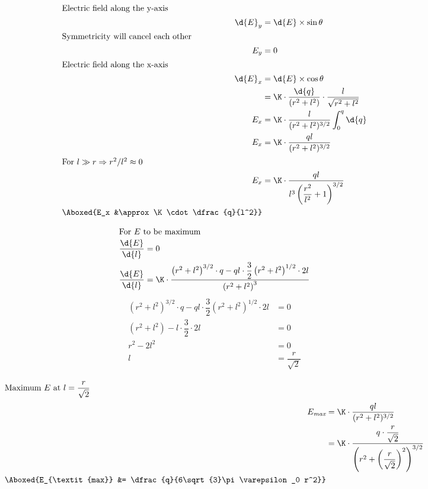 \documentclass{article}
\begin{document}
\addtolength{\jot}{3ex}
\begin{align*}
\intertext{Electric field along the y-axis}
\d{E}_y &= \d{E}\times\sin\theta\\
\intertext{Symmetricity will cancel each other}
E_y &= 0\\
\intertext{Electric field along the x-axis}
\d{E}_x &= \d{E}\times\cos\theta\\
		&= \K\cdot \dfrac{\d{q}}{(r^2+l^2)} \cdot \dfrac{l}{\sqrt{r^2+ l^2}}\\
E_x	&=  \K \cdot \dfrac{l}{(r^2+l^2)^{3/2}} \int_0^q \d{q}\\
E_x	&=  \K \cdot \dfrac{ql}{(r^2+l^2)^{3/2}} \\
\intertext{For $l\gg r \Rightarrow r^2/l^2 \approx 0$}
E_x	&= \K \cdot \dfrac{ql}{l^3\left(\dfrac{r^2}{l^2}+1\right)^{3/2}}\\
\Aboxed{E_x &\approx\K \cdot \dfrac{q}{l^2}}
\end{align*}

\pagebreak

\begin{align*}
\intertext{For $E$ to be maximum}
\dfrac{\d{E}}{\d{l}} &= 0\\
\dfrac{\d{E}}{\d{l}} &= \K \cdot \dfrac{\left(r^2+l^2\right)^{3/2}\cdot q-ql\cdot\dfrac{3}{2}\left(r^2+l^2\right)^{1/2}\cdot 2l}{\left(r^2+l^2\right)^3}
\end{align*}
\begin{align*}
\left(r^2+l^2\right)^{3/2}\cdot q-ql\cdot\dfrac{3}{2}\left(r^2+l^2\right)^{1/2}\cdot 2l &= 0\\
\left(r^2+l^2\right)-l\cdot\dfrac{3}{2}\cdot 2l &= 0\\
r^2 - 2l^2 &= 0\\
l &= \dfrac{r}{\sqrt{2}}
\end{align*}

\pagebreak

\begin{align*}
\intertext{Maximum $E$ at $l = \dfrac{r}{\sqrt{2}}$}
E_{\textit{max}} &= \K \cdot \dfrac{ql}{(r^2+l^2)^{3/2}} \\
	&= \K \cdot \dfrac{q\cdot \dfrac{r}{\sqrt{2}}}{\left(r^2+\left(\dfrac{r}{\sqrt{2}}\right)^2\right)^{3/2}}\\
\Aboxed{E_{\textit{max}} &= \dfrac{q}{6\sqrt{3}\pi\varepsilon_0 r^2}}
\end{align*}
\pagebreak

\vspace*{\fill}
\begin{center}
\end{center}
\vspace*{\fill}
\pagebreak


\vspace*{\fill}
\begin{center}
	\fbox{\qrcode[height=2cm]{\gdrive}}
\end{center}
\vspace*{\fill}
\end{document}
